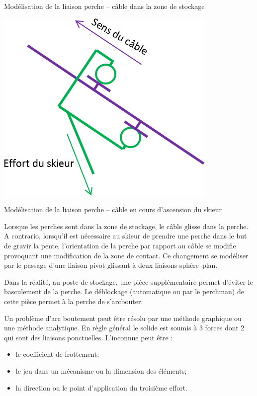 \documentclass[11pt,oneside]{article}
\begin{document}
\begin{exemple}
\begin{center}
\begin{minipage}[c]{.3\linewidth}
\begin{center}
Modélisation de la liaison perche -- câble dans la zone de stockage
\end{center}
\end{minipage}\hfill
\begin{minipage}[c]{.3\linewidth}
\begin{center}
\includegraphics[width=.9\textwidth]{png/arc2}

Modélisation de la liaison perche -- câble en cours d'ascension du skieur
\end{center}
\end{minipage}
\end{center}
\vspace{.5cm}

Lorsque les perches sont dans la zone de stockage, le câble glisse dans la perche. A contrario, lorsqu'il est nécessaire au skieur de prendre une perche dans le but de gravir la pente, l'orientation de la perche par rapport au câble se modifie provoquant une modification de la zone de contact. Ce changement se modéliser par le passage d'une liaison pivot glissant à deux liaisons sphère--plan.

Dans la réalité, au poste de stockage, une pièce supplémentaire permet d'éviter le basculement de la perche. Le déblockage (automatique ou par le perchman) de cette pièce permet à la perche de s'arcbouter. 

\end{exemple}

Un problème d'arc boutement peut être résolu par une méthode graphique ou une méthode analytique. En règle général le solide est soumis à 3 forces dont 2 qui sont des liaisons ponctuelles. 
L'inconnue peut être :
\begin{itemize}
\item le coefficient de frottement;
\item le jeu dans un mécanisme ou la dimension des éléments;
\item la direction ou le point d'application du troisième effort.
\end{itemize}
\end{document}
